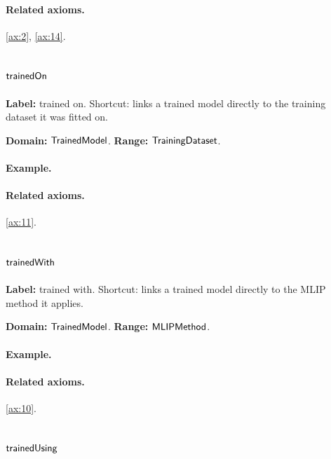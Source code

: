\paragraph{Related axioms.} \eqref{ax:2}, \eqref{ax:14}.

\subsection{$\mathsf{trainedOn}$}
\label{sec:term-trainedOn}

\textbf{Label:} trained on.
Shortcut: links a trained model directly to the training dataset it was fitted on.

\textbf{Domain:} $\mathsf{TrainedModel}$.
\textbf{Range:} $\mathsf{TrainingDataset}$.

\paragraph{Example.}

\paragraph{Related axioms.} \eqref{ax:11}.

\subsection{$\mathsf{trainedWith}$}
\label{sec:term-trainedWith}

\textbf{Label:} trained with.
Shortcut: links a trained model directly to the MLIP method it applies.

\textbf{Domain:} $\mathsf{TrainedModel}$.
\textbf{Range:} $\mathsf{MLIPMethod}$.

\paragraph{Example.}

\paragraph{Related axioms.} \eqref{ax:10}.

\subsection{$\mathsf{trainedUsing}$}
\label{sec:term-trainedUsing}

